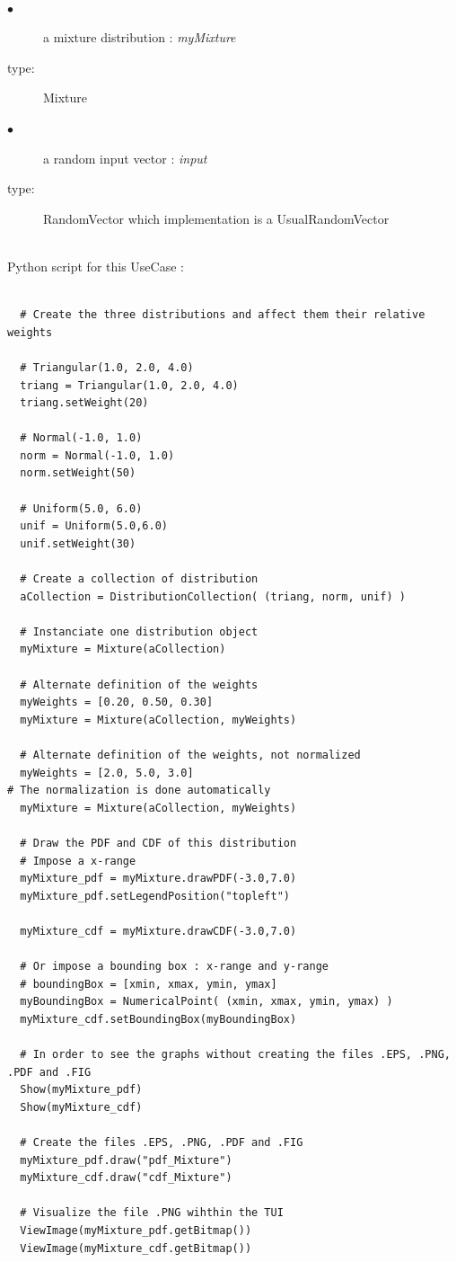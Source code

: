 \textspace\\
\noindent%
{
  \begin{description}
  \item[$\bullet$] a mixture distribution : {\itshape myMixture}
  \item[type:] Mixture
  \item[$\bullet$] a random input vector : {\itshape input}
  \item[type:] RandomVector which implementation is a UsualRandomVector
  \end{description}
}

\textspace\\
Python script for this UseCase :

\begin{lstlisting}

  # Create the three distributions and affect them their relative weights 

  # Triangular(1.0, 2.0, 4.0)
  triang = Triangular(1.0, 2.0, 4.0)
  triang.setWeight(20)

  # Normal(-1.0, 1.0)
  norm = Normal(-1.0, 1.0)
  norm.setWeight(50)

  # Uniform(5.0, 6.0)
  unif = Uniform(5.0,6.0)
  unif.setWeight(30)

  # Create a collection of distribution
  aCollection = DistributionCollection( (triang, norm, unif) )

  # Instanciate one distribution object
  myMixture = Mixture(aCollection)

  # Alternate definition of the weights
  myWeights = [0.20, 0.50, 0.30]
  myMixture = Mixture(aCollection, myWeights)

  # Alternate definition of the weights, not normalized
  myWeights = [2.0, 5.0, 3.0]
# The normalization is done automatically
  myMixture = Mixture(aCollection, myWeights)

  # Draw the PDF and CDF of this distribution
  # Impose a x-range
  myMixture_pdf = myMixture.drawPDF(-3.0,7.0)
  myMixture_pdf.setLegendPosition("topleft")

  myMixture_cdf = myMixture.drawCDF(-3.0,7.0)

  # Or impose a bounding box : x-range and y-range
  # boundingBox = [xmin, xmax, ymin, ymax]
  myBoundingBox = NumericalPoint( (xmin, xmax, ymin, ymax) )
  myMixture_cdf.setBoundingBox(myBoundingBox)

  # In order to see the graphs without creating the files .EPS, .PNG, .PDF and .FIG
  Show(myMixture_pdf)
  Show(myMixture_cdf)

  # Create the files .EPS, .PNG, .PDF and .FIG
  myMixture_pdf.draw("pdf_Mixture")
  myMixture_cdf.draw("cdf_Mixture")

  # Visualize the file .PNG wihthin the TUI
  ViewImage(myMixture_pdf.getBitmap())
  ViewImage(myMixture_cdf.getBitmap())
\end{lstlisting}
\textspace\\


